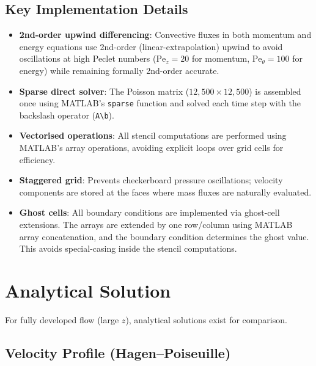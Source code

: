 \documentclass[12pt,a4paper]{article}
\begin{document}
\subsection{Key Implementation Details}

\begin{itemize}
    \item \textbf{2nd-order upwind differencing}: Convective fluxes in both momentum and energy equations use 2nd-order (linear-extrapolation) upwind to avoid oscillations at high Peclet numbers ($\text{Pe}_z = 20$ for momentum, $\text{Pe}_{\theta} = 100$ for energy) while remaining formally 2nd-order accurate.

    \item \textbf{Sparse direct solver}: The Poisson matrix ($12{,}500 \times 12{,}500$) is assembled once using MATLAB's \texttt{sparse} function and solved each time step with the backslash operator (\texttt{A\textbackslash b}).

    \item \textbf{Vectorised operations}: All stencil computations are performed using MATLAB's array operations, avoiding explicit loops over grid cells for efficiency.

    \item \textbf{Staggered grid}: Prevents checkerboard pressure oscillations; velocity components are stored at the faces where mass fluxes are naturally evaluated.

    \item \textbf{Ghost cells}: All boundary conditions are implemented via ghost-cell extensions. The arrays are extended by one row/column using MATLAB array concatenation, and the boundary condition determines the ghost value. This avoids special-casing inside the stencil computations.
\end{itemize}

\newpage

\section{Analytical Solution}

For fully developed flow (large $z$), analytical solutions exist for comparison.

\subsection{Velocity Profile (Hagen--Poiseuille)}
\end{document}
